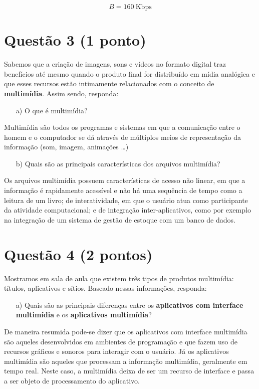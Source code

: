 \documentclass[a4paper,11pt]{article}
\begin{document}
\[
B = 160\ \text{Kbps}
\]

\pagebreak

\section*{Questão 3 (1 ponto)}
Sabemos que a criação de imagens, sons e vídeos no formato digital traz
benefícios até mesmo quando o produto final for distribuído em mídia analógica e
que esses recursos estão intimamente relacionados com o conceito de {\bf
multimídia}. Assim sendo, responda:

\begin{itemize}
    \item[a)] O que é multimídia?
\end{itemize}

Multimídia são todos os programas e sistemas em que a comunicação entre o homem
e o computador se dá através de múltiplos meios de representação da informação
(som, imagem, animações \ldots)

\begin{itemize}
    \item[b)] Quais são as principais características dos arquivos multimídia?
\end{itemize}

Os arquivos multimídia possuem características de acesso não linear, em que a
informação é rapidamente acessível e não há uma sequência de tempo como a
leitura de um livro; de interatividade, em que o usuário atua como participante
da atividade computacional; e de integração inter-aplicativos, como por exemplo
na integração de um sistema de gestão de estoque com um banco de dados.

\pagebreak

\section*{Questão 4 (2 pontos)}
Mostramos em sala de aula que existem três tipos de produtos multimídia:
títulos, aplicativos e sítios. Baseado nessas informações, responda:

\begin{itemize}
    \item[a)] Quais são as principais diferenças entre os {\bf aplicativos com
interface multimídia} e os {\bf aplicativos multimídia}?
\end{itemize}

De maneira resumida pode-se dizer que os aplicativos com interface multimídia
são aqueles desenvolvidos em ambientes de programação e que fazem uso de
recursos gráficos e sonoros para interagir com o usuário. Já os aplicativos
multimídia são aqueles que processam a informação multimídia, geralmente em
tempo real. Neste caso, a multimídia deixa de ser um recurso de interface e
passa a ser objeto de processamento do aplicativo.
\end{document}
